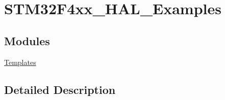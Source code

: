 \hypertarget{group___s_t_m32_f4xx___h_a_l___examples}{}\section{S\+T\+M32\+F4xx\+\_\+\+H\+A\+L\+\_\+\+Examples}
\label{group___s_t_m32_f4xx___h_a_l___examples}
\subsection*{Modules}
\begin{DoxyCompactItemize}
\item 
\mbox{\hyperlink{group___templates}{Templates}}
\end{DoxyCompactItemize}


\subsection{Detailed Description}
